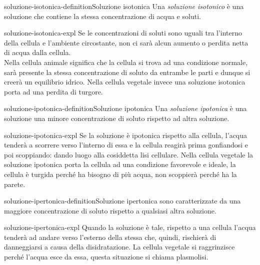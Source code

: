\documentclass[preview]{standalone}
\begin{document}
\begin{snippetdefinition}{soluzione-isotonica-definition}{Soluzione isotonica}
    Una \textit{soluzione isotonico} è una soluzione che contiene la stessa
    concentrazione di acqua e soluti.
\end{snippetdefinition}

\begin{snippet}{soluzione-isotonica-expl}
    Se le concentrazioni di soluti sono
    uguali tra l'interno della cellula e l'ambiente circostante, non ci sarà
    alcun aumento o perdita netta di acqua dalla cellula. \\
    Nella cellula animale significa che la cellula si trova ad
    una condizione normale, sarà presente la stessa concentrazione di soluto
    da entrambe le parti e dunque si creerà un equilibrio idrico. Nella cellula
    vegetale invece una soluzione isotonica porta ad una perdita di turgore.
\end{snippet}

\begin{snippetdefinition}{soluzione-ipotonica-definition}{Soluzione ipotonica}
    Una \textit{soluzione ipotonica} è una soluzione una minore concentrazione di soluto rispetto ad
    altra soluzione.
\end{snippetdefinition}

\begin{snippet}{soluzione-ipotonica-expl}
    Se la soluzione è ipotonica rispetto alla cellula, l'acqua tenderà a scorrere verso
    l'interno di essa e la cellula reagirà prima gonfiandosi e poi scoppiando: dando luogo alla cosiddetta lisi
    cellulare. Nella cellula vegetale la soluzione ipotonica porta la cellula ad una condizione favorevole e
    ideale, la cellula è turgida perché ha bisogno di più acqua, non scoppierà perché ha la parete.
\end{snippet}

\begin{snippetdefinition}{soluzione-ipertonica-definition}{Soluzione ipertonica}
    sono caratterizzate da una maggiore concentrazione di soluto rispetto a
    qualsiasi altra soluzione.
\end{snippetdefinition}

\begin{snippet}{soluzione-ipertonica-expl}
    Quando la soluzione è tale, rispetto a una cellula l'acqua tenderà ad andare
    verso l'esterno della stessa che, quindi, rischierà di danneggiarsi a causa della disidratazione. La cellula
    vegetale si raggrinzisce perché l'acqua esce da essa, questa situazione si chiama plasmolisi.
\end{snippet}
\end{document}
